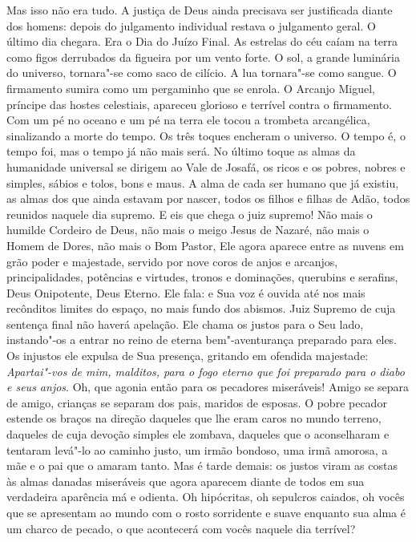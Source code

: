 Mas isso não era tudo. A justiça de Deus ainda precisava ser justificada
diante dos homens: depois do julgamento individual restava o julgamento
geral. O último dia chegara. Era o Dia do Juízo Final. As estrelas do
céu caíam na terra como figos derrubados da figueira por um vento
forte. O sol, a grande luminária do universo, tornara"-se como saco de
cilício. A lua tornara"-se como sangue. O firmamento sumira como um
pergaminho que se enrola. O Arcanjo Miguel, príncipe das hostes
celestiais, apareceu glorioso e terrível contra o firmamento. Com um pé
no oceano e um pé na terra ele tocou a trombeta arcangélica,
sinalizando a morte do tempo. Os três toques encheram o universo. O
tempo é, o tempo foi, mas o tempo já não mais será. No último toque as
almas da humanidade universal se dirigem ao Vale de Josafá, os ricos e
os pobres, nobres e simples, sábios e tolos, bons e maus. A alma de
cada ser humano que já existiu, as almas dos que ainda estavam por
nascer, todos os filhos e filhas de Adão, todos reunidos naquele dia
supremo. E eis que chega o juiz supremo! Não mais o humilde Cordeiro de
Deus, não mais o meigo Jesus de Nazaré, não mais o Homem de Dores, não
mais o Bom Pastor, Ele agora aparece entre as nuvens em grão poder e
majestade, servido por nove coros de anjos e arcanjos, principalidades,
potências e virtudes, tronos e dominações, querubins e serafins, Deus
Onipotente, Deus Eterno. Ele fala: e Sua voz é ouvida até nos mais
recônditos limites do espaço, no mais fundo dos abismos. Juiz Supremo
de cuja sentença final não haverá apelação. Ele chama os justos para o
Seu lado, instando"-os a entrar no reino de eterna bem"-aventurança
preparado para eles. Os injustos ele expulsa de Sua presença, gritando
em ofendida majestade: \textit{Apartai"-vos de mim, malditos, para o fogo
eterno que foi preparado para o diabo e seus anjos}. Oh, que agonia
então para os pecadores miseráveis! Amigo se separa de amigo, crianças
se separam dos pais, maridos de esposas. O pobre pecador estende os
braços na direção daqueles que lhe eram caros no mundo terreno,
daqueles de cuja devoção simples ele zombava, daqueles que o
aconselharam e tentaram levá"-lo ao caminho justo, um irmão bondoso, uma
irmã amorosa, a mãe e o pai que o amaram tanto. Mas é tarde demais: os
justos viram as costas às almas danadas miseráveis que agora aparecem
diante de todos em sua verdadeira aparência má e odienta. Oh hipócritas,
oh sepulcros caiados, oh vocês que se apresentam ao mundo com o rosto
sorridente e suave enquanto sua alma é um charco de pecado, o que
acontecerá com vocês naquele dia terrível?

